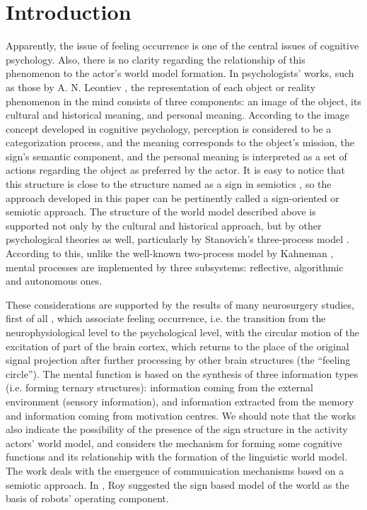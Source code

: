 \documentclass[review]{elsarticle}
\begin{document}
\linenumbers

\section*{Introduction}
Apparently, the issue of feeling occurrence is one of the central issues of cognitive psychology. Also, there is no clarity regarding the relationship of this phenomenon to the actor’s world model formation. In psychologists’ works, such as those by A. N. Leontiev \cite{Leontiev2009,Igira2009}, the representation of each object or reality phenomenon in the mind consists of three components: an image of the object, its cultural and historical meaning, and personal meaning. According to the image concept developed in cognitive psychology, perception is considered to be a categorization process, and the meaning corresponds to the object’s mission, the sign’s semantic component, and the personal meaning is interpreted as a set of actions regarding the object as preferred by the actor. It is easy to notice that this structure is close to the structure named as a sign in semiotics \cite{Pierce2000b,Frege2000}, so the approach developed in this paper can be pertinently called a sign-oriented or semiotic approach. The structure of the world model described above is supported not only by the cultural and historical approach, but by other psychological theories as well, particularly by Stanovich’s three-process model \cite{Stanovich2009}. According to this, unlike the well-known two-process model by Kahneman \cite{Kahneman2011}, mental processes are implemented by three subsystems: reflective, algorithmic and autonomous ones.

These considerations are supported by the results of many neurosurgery studies, first of all \cite{Ivanitsky1996}, which associate feeling occurrence, i.e. the transition from the neurophysiological level to the psychological level, with the circular motion of the excitation of part of the brain cortex, which returns to the place of the original signal projection after further processing by other brain structures (the ``feeling circle''). The mental function \cite{Ivanitsky2010} is based on the synthesis of three information types (i.e. forming ternary structures): information coming from the external environment (sensory information), and information extracted from the memory and information coming from motivation centres. We should note that the works \cite{Edelmen1981} also indicate the possibility of the presence of the sign structure in the activity actors’ world model, and \cite{Friederici2015} considers the mechanism for forming some cognitive functions and its relationship with the formation of the linguistic world model. The work \cite{Loula2012} deals with the emergence of communication mechanisms based on a semiotic approach. In \cite{Roy2005}, Roy suggested the sign based model of the world as the basis of robots’ operating component.
\end{document}
